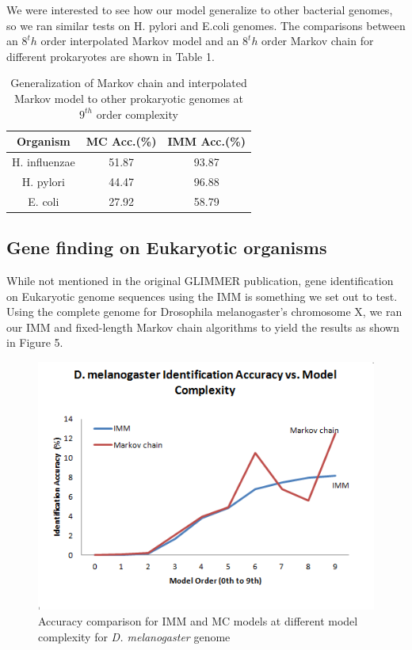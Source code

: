 \documentclass[11pt,letterpaper]{article}
\begin{document}
We were interested to see how our model generalize to other bacterial genomes, so we ran similar tests on H. pylori and E.coli genomes. The comparisons between an $8^th$ order interpolated Markov model and an $8^th$ order Markov chain for different prokaryotes are shown in Table 1.

\begin{table}
	\begin{center}
		\begin{tabular}{|c|c|c|}
			\hline \bf Organism & \bf MC Acc.(\%) & \bf IMM Acc.(\%) \\ \hline
			H. influenzae & 51.87 & 93.87 \\
			\hline
			H. pylori & 44.47 & 96.88 \\
			\hline
			E. coli & 27.92 & 58.79 \\
			\hline
		\end{tabular}
	\end{center}
	\caption{\label{font-table} Generalization of Markov chain and interpolated Markov model to other prokaryotic genomes at $9^{th}$ order complexity}
\end{table}


\subsection{Gene finding on Eukaryotic organisms}

While not mentioned in the original GLIMMER publication, gene identification on Eukaryotic genome sequences using the IMM is something we set out to test. Using the complete genome for Drosophila melanogaster’s chromosome X, we ran our IMM and fixed-length Markov chain algorithms to yield the results as shown in Figure 5.

\begin{figure}
	\begin{center}
		\includegraphics[scale=0.8]{plots/accuracy_vs_model_complexity_drosophila.png}
	\end{center}
	\caption{\label{font-table} Accuracy comparison for IMM and MC models at different model complexity for \emph{D. melanogaster} genome}
\end{figure}
\end{document}
